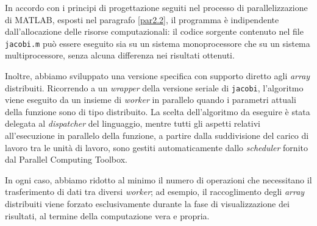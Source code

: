 In accordo con i principi di progettazione seguiti nel processo di parallelizzazione di MATLAB, esposti nel paragrafo \ref{par2.2}, il programma \`e 
indipendente dall'allocazione delle risorse computazionali: il codice sorgente contenuto nel file \lstinline{jacobi.m} pu\`o essere eseguito sia su un 
sistema monoprocessore che su un sistema multiprocessore, senza alcuna differenza nei risultati ottenuti.

Inoltre, abbiamo sviluppato una versione specifica con supporto diretto agli \textit{array} distribuiti.\newline
Ricorrendo a un \textit{wrapper} della versione seriale di \lstinline{jacobi}, l'algoritmo viene eseguito da un insieme di \textit{worker} in parallelo 
quando i parametri attuali della funzione sono di tipo distribuito.\newline
La scelta dell'algoritmo da eseguire \`e stata delegata al \textit{dispatcher} del linguaggio, 
mentre tutti gli aspetti relativi all'esecuzione in parallelo della funzione, a partire dalla suddivisione del carico di lavoro tra le unit\`a di lavoro, sono 
gestiti automaticamente dallo \textit{scheduler} fornito dal Parallel Computing Toolbox.

In ogni caso, abbiamo ridotto al minimo il numero di operazioni che necessitano il trasferimento di dati tra diversi \textit{worker}; ad esempio, 
il raccoglimento degli \textit{array} distribuiti viene forzato esclusivamente durante la fase di visualizzazione dei risultati, al termine della computazione vera e propria.

